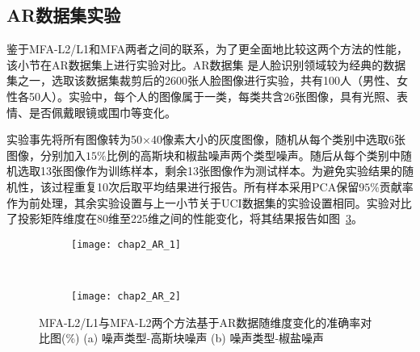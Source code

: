 \begin{table}[htbp]
\small
{\renewcommand\baselinestretch{0.9}\selectfont
\renewcommand{\arraystretch}{1.3}
    \caption{各算法基于UCI数据集的实验结果排名}
    \label{tab:chap2_UCIRk}
\centering
{}
\par}
\end{table}

\subsection{AR数据集实验} 

鉴于MFA-L2/L1和MFA两者之间的联系，为了更全面地比较这两个方法的性能，该小节在AR数据集上进行实验对比。AR数据集 \citep{AR01}是人脸识别领域较为经典的数据集之一，选取该数据集裁剪后的2600张人脸图像进行实验，共有100人（男性、女性各50人）。实验中，每个人的图像属于一类，每类共含26张图像，具有光照、表情、是否佩戴眼镜或围巾等变化。

实验事先将所有图像转为50×40像素大小的灰度图像，随机从每个类别中选取6张图像，分别加入$15\%$比例的高斯块和椒盐噪声两个类型噪声。随后从每个类别中随机选取13张图像作为训练样本，剩余13张图像作为测试样本。为避免实验结果的随机性，该过程重复10次后取平均结果进行报告。所有样本采用PCA保留$95\%$贡献率作为前处理，其余实验设置与上一小节关于UCI数据集的实验设置相同。实验对比了投影矩阵维度在80维至225维之间的性能变化，将其结果报告如图~\ref{fig:AR}。
\begin{figure}[!htbp]
\centering
    \begin{subfigure}[b]{0.7\textwidth}
      \texttt{[image: chap2\_AR\_1]}
      \caption{}
      \label{fig:AR_1}
    \end{subfigure}%
    \\ %
    \begin{subfigure}[b]{0.7\textwidth}
      \texttt{[image: chap2\_AR\_2]}
      \caption{}
      \label{fig:AR_2}
    \end{subfigure}%
    \caption{MFA-L2/L1与MFA-L2两个方法基于AR数据随维度变化的准确率对比图(\%) (a) 噪声类型-高斯块噪声 (b) 噪声类型-椒盐噪声}
    \label{fig:AR}
\end{figure}

